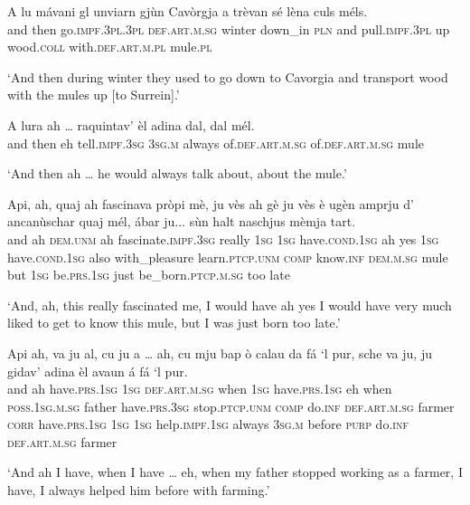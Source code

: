 \begin{linenumbers}
\gll  A lu mávani gl unviarn gjùn Cavòrgja a trèvan sé lèna culs méls.\\
and then go.\textsc{impf.3pl.3pl} \textsc{def.art.m.sg} winter down\_in \textsc{pln} and pull.\textsc{impf.3pl} up wood.\textsc{coll} with.\textsc{def.art.m.pl} mule.\textsc{pl} \\
\end{linenumbers}
\medskip
\glt `And then during winter they used to go down to Cavorgia and transport wood with the mules up [to Surrein].'
\medskip

\begin{linenumbers}
\gll  A lura ah … raquintav’ èl adina dal, dal mél.  \\
and then eh {} tell.\textsc{impf.3sg} \textsc{3sg.m} always of.\textsc{def.art.m.sg} of.\textsc{def.art.m.sg} mule\\
\end{linenumbers}
\medskip
\glt `And  then ah … he would always talk about, about the mule.'
\medskip

\begin{linenumbers}
\gll  Api, ah, quaj ah fascinava pròpi mè, ju vès ah gè ju vès è ugèn amprju d’ ancanùschar quaj mél, ábar ju... sùn halt naschjus mèmja tart. \\
and ah \textsc{dem.unm} ah fascinate.\textsc{impf.3sg} really \textsc{1sg}  \textsc{1sg} have.\textsc{cond.1sg} ah yes \textsc{1sg} have.\textsc{cond.1sg} also with\_pleasure learn.\textsc{ptcp.unm} \textsc{comp} know.\textsc{inf} \textsc{dem.m.sg} mule but \textsc{1sg} be.\textsc{prs.1sg} just be\_born.\textsc{ptcp.m.sg} too late\\
\end{linenumbers}
\medskip
\glt `And, ah, this really fascinated me, I would have ah yes I would have very much liked to get to know this mule, but I was just born too late.'
\medskip

\begin{linenumbers}
\gll  Api ah, va ju al, cu ju a … ah, cu mju bap ò calau da fá `l pur, sche va ju, ju gidav’ adina èl avaun á fá `l pur.  \\
and ah  have.\textsc{prs.1sg} \textsc{1sg} \textsc{def.art.m.sg} when \textsc{1sg} have.\textsc{prs.1sg} {} eh when \textsc{poss.1sg.m.sg} father have.\textsc{prs.3sg} stop.\textsc{ptcp.unm} \textsc{comp} do.\textsc{inf} \textsc{def.art.m.sg} farmer \textsc{corr} have.\textsc{prs.1sg} \textsc{1sg} \textsc{1sg} help.\textsc{impf.1sg} always \textsc{3sg.m} before \textsc{purp} do.\textsc{inf} \textsc{def.art.m.sg} farmer \\
\end{linenumbers}
\medskip
\glt `And ah I have, when I have … eh, when my father stopped working as a farmer, I have, I always helped him before with farming.'
\medskip

